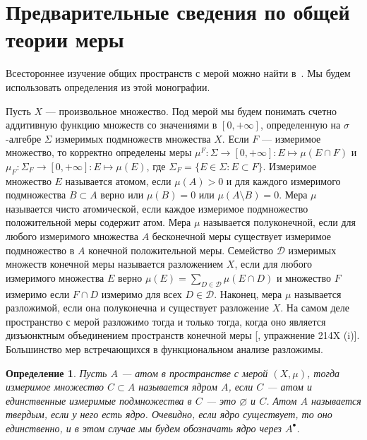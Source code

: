 \documentclass[12pt]{article}
\newtheorem{definition}[theorem]{Определение}
\begin{document}
\section{Предварительные сведения по общей теории
  меры}\label{SectionPreliminariesOnGeneralMeasureTheory}

Всестороннее изучение общих пространств с мерой можно найти
в~\cite{FremMeasTh2}. Мы будем использовать определения из этой монографии.

Пусть $X$ --- произвольное множество. Под мерой мы будем понимать счетно
аддитивную функцию множеств со значениями в $[0,+\infty]$, определенную на
$\sigma$-алгебре $\Sigma$ измеримых подмножеств множества $X$. Если $F$ ---
измеримое множество, то корректно определены меры
$\mu^F:\Sigma\to[0,+\infty]:E\mapsto \mu(E\cap F)$ и
$\mu_F:\Sigma_F\to[0,+\infty]: E\mapsto \mu(E)$, где
$\Sigma_F=\{E\in\Sigma:E\subset F\}$. Измеримое множество $E$ называется атомом,
если $\mu(A)>0$ и для каждого измеримого подмножества $B\subset A$ верно или
$\mu(B)=0$ или $\mu(A\setminus B)=0$. Мера $\mu$ называется чисто атомической,
если каждое измеримое подмножество положительной меры содержит атом. Мера $\mu$
называется полуконечной, если для любого измеримого множества $A$ бесконечной
меры существует измеримое подмножество в $A$ конечной положительной меры.
Семейство $\mathcal{D}$ измеримых множеств конечной меры называется разложением
$X$, если для любого измеримого множества $E$ верно
$\mu(E)=\sum_{D\in\mathcal{D}}\mu(E\cap D)$ и множество $F$ измеримо если $F\cap
    D$ измеримо для всех $D\in\mathcal{D}$. Наконец, мера $\mu$ называется
разложимой, если она полуконечна и существует разложение $X$. На самом деле
пространство с мерой разложимо тогда и только тогда, когда оно является
дизъюнктным объединением пространств конечной меры [\cite{FremMeasTh2},
упражнение 214X (i)]. Большинство мер встречающихся в функциональном анализе
разложимы.

\begin{definition}\label{AtomCore} Пусть $A$ --- атом в пространстве с мерой
    $(X,\mu)$, тогда измеримое множество $C\subset A$ называется ядром $A$, если
    $C$ --- атом и единственные измеримые подмножества в $C$ --- это
    $\varnothing$ и $C$. Атом $A$ называется твердым, если у него есть ядро.
    Очевидно, если ядро существует, то оно единственно, и в этом случае мы будем
    обозначать ядро через $A^\bullet$.
\end{definition}
\end{document}
